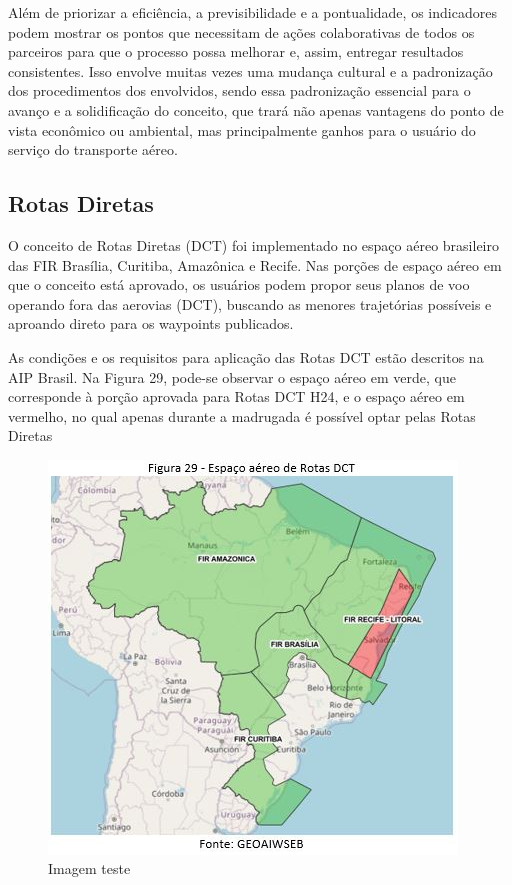 \documentclass[
]{book}
\begin{document}
Além de priorizar a eficiência, a previsibilidade e a pontualidade, os indicadores podem mostrar os pontos que necessitam de ações colaborativas de todos os parceiros para que o processo possa melhorar e, assim, entregar resultados consistentes. Isso envolve muitas vezes uma mudança cultural e a padronização dos procedimentos dos envolvidos, sendo essa padronização essencial para o avanço e a solidificação do conceito, que trará não apenas vantagens do ponto de vista econômico ou ambiental, mas principalmente ganhos para o usuário do serviço do transporte aéreo.

\hypertarget{rotas-diretas}{%
\subsection{Rotas Diretas}\label{rotas-diretas}}

O conceito de Rotas Diretas (DCT) foi implementado no espaço aéreo brasileiro das FIR Brasília, Curitiba, Amazônica e Recife. Nas porções de espaço aéreo em que o conceito está aprovado, os usuários podem propor seus planos de voo operando fora das aerovias (DCT), buscando as menores trajetórias possíveis e aproando direto para os waypoints publicados.

As condições e os requisitos para aplicação das Rotas DCT estão descritos na AIP Brasil. Na Figura 29, pode-se observar o espaço aéreo em verde, que corresponde à porção aprovada para Rotas DCT H24, e o espaço aéreo em vermelho, no qual apenas durante a madrugada é possível optar pelas Rotas Diretas

\begin{figure}
\centering
\includegraphics{imagens/fig33.jpg}
\caption{Imagem teste}
\end{figure}
\end{document}
